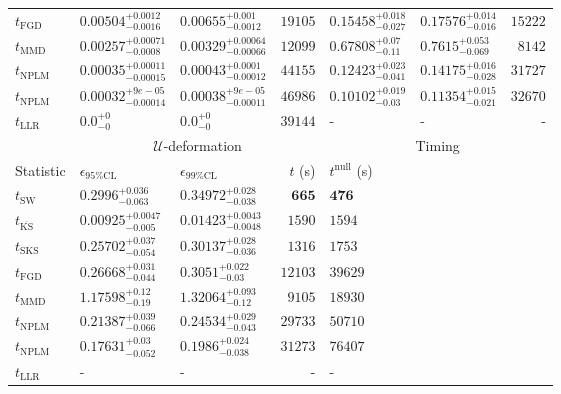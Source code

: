 \begin{tabular}{l|llr|llr}
	$t_{\mathrm{FGD}}$ & $0.00504_{-0.0016}^{+0.0012}$ & $0.00655_{-0.0012}^{+0.001}$ & $19105$ & $0.15458_{-0.027}^{+0.018}$ & $0.17576_{-0.016}^{+0.014}$ & $15222$ \\
	$t_{\mathrm{MMD}}$ & $0.00257_{-0.0008}^{+0.00071}$ & $0.00329_{-0.00066}^{+0.00064}$ & $12099$ & $0.67808_{-0.11}^{+0.07}$ & $0.7615_{-0.069}^{+0.053}$ & $8142$ \\
\rowcolor{red!35}	$t_{\mathrm{NPLM}}$ & $0.00035_{-0.00015}^{+0.00011}$ & $0.00043_{-0.00012}^{+0.0001}$ & $44155$ & $0.12423_{-0.041}^{+0.023}$ & $0.14175_{-0.028}^{+0.016}$ & $31727$ \\
\rowcolor{blue!35}	$t_{\mathrm{NPLM}}$ & $0.00032_{-0.00014}^{+9e-05}$ & $0.00038_{-0.00011}^{+9e-05}$ & $46986$ & $0.10102_{-0.03}^{+0.019}$ & $0.11354_{-0.021}^{+0.015}$ & $32670$ \\
	$t_{\mathrm{LLR}}$ & $0.0_{-0}^{+0}$ & $0.0_{-0}^{+0}$ & $39144$ & - & - & - \\
	\toprule
	\multicolumn{1}{c}{} & \multicolumn{3}{c}{$\mathcal{U}$-deformation} & \multicolumn{3}{c}{Timing} \\
	Statistic & $\epsilon_{95\%\mathrm{CL}}$ & $\epsilon_{99\%\mathrm{CL}}$ & $t$ (s) & $t^{\mathrm{null}}$ (s) \\
	\midrule
	$t_{\mathrm{SW}}$ & $0.2996_{-0.063}^{+0.036}$ & $0.34972_{-0.038}^{+0.028}$ & ${\mathbf{665}}$ & ${\mathbf{476}}$ \\
	$t_{\overline{\mathrm{KS}}}$ & ${\mathbf{0.00925_{-0.005}^{+0.0047}}}$ & ${\mathbf{0.01423_{-0.0048}^{+0.0043}}}$ & $1590$ & $1594$ \\
	$t_{\mathrm{SKS}}$ & $0.25702_{-0.054}^{+0.037}$ & $0.30137_{-0.036}^{+0.028}$ & $1316$ & $1753$ \\
	$t_{\mathrm{FGD}}$ & $0.26668_{-0.044}^{+0.031}$ & $0.3051_{-0.03}^{+0.022}$ & $12103$ & $39629$ \\
	$t_{\mathrm{MMD}}$ & $1.17598_{-0.19}^{+0.12}$ & $1.32064_{-0.12}^{+0.093}$ & $9105$ & $18930$ \\
\rowcolor{red!35}	$t_{\mathrm{NPLM}}$ & $0.21387_{-0.066}^{+0.039}$ & $0.24534_{-0.043}^{+0.029}$ & $29733$ & $50710$ \\
\rowcolor{blue!35}	$t_{\mathrm{NPLM}}$ & $0.17631_{-0.052}^{+0.03}$ & $0.1986_{-0.038}^{+0.024}$ & $31273$ & $76407$ \\
	$t_{\mathrm{LLR}}$ & - & - & - & - \\
	\bottomrule
\end{tabular}